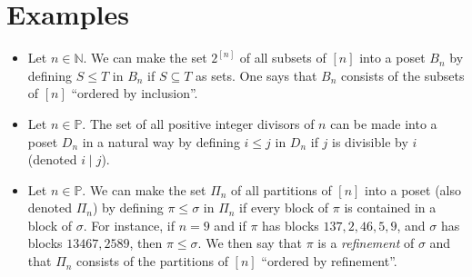 \section{Examples}
\label{ex:poset:def}


\begin{itemize}
\item Let $n \in \mathbb{N}$. We can make the set $2^{[n]}$ of all subsets of $[n]$ into a poset $B_n$ by defining $S \leq T$ in $B_n$ if $S \subseteq T$ as sets. One says that $B_n$ consists of the subsets of $[n]$ ``ordered by inclusion''. \cite{Stanley:2011:ECV:2124415}
\item Let $n \in \mathbb{P}$. The set of all positive integer divisors of $n$ can be made into a poset $D_n$ in a natural way by defining $i \leq j$ in $D_n$ if $j$ is divisible by $i$ (denoted $i \mid j$). \cite{Stanley:2011:ECV:2124415}
\item Let $n \in \mathbb{P}$. We can make the set $\Pi_n$ of all partitions of $[n]$ into a poset (also denoted $\Pi_n$) by defining $\pi \leq \sigma$ in $\Pi_n$ if every block of $\pi$ is contained in a block of $\sigma$. For instance, if $n = 9$ and if $\pi$ has blocks $137, 2, 46, 5, 9$, and $\sigma$ has blocks $13467, 2589$, then $\pi \leq \sigma$. We then say that $\pi$ is a \emph{refinement} of $\sigma$ and that $\Pi_n$ consists of the partitions of $[n]$ ``ordered by refinement''.  \cite{Stanley:2011:ECV:2124415}
\end{itemize}